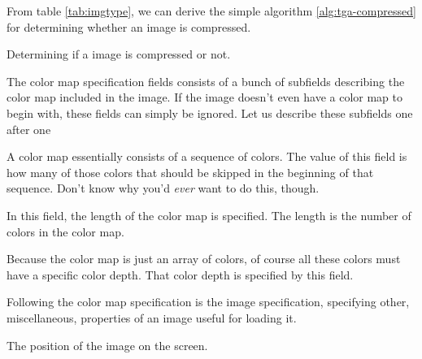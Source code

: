 \begin{refsection}
  From table \ref{tab:imgtype}, we can derive the simple algorithm
  \ref{alg:tga-compressed} for determining whether an image is
  compressed.

  \begin{algorithm}[H]
    \caption{Determining if a \tga image is compressed or not.}
    \label{alg:tga-compressed}
    \begin{algorithmic}[1]
    \end{algorithmic}
  \end{algorithm}


  The color map specification fields consists of a bunch of subfields
  describing the color map included in the image. If the image
  doesn't even have a color map to begin with, these fields can simply
  be ignored. Let us describe these subfields one after one


  A color map essentially consists of a sequence of colors. The value
  of this field is how many of those colors that should be skipped in
  the beginning of that sequence. Don't know why you'd \textit{ever}
  want to do this, though.


  In this field, the length of the color map is specified. The
  length is the number of colors in the color map.


  Because the color map is just an array of colors, of course all
  these colors must have a specific color depth. That color depth is
  specified by this field.


  Following the color map specification is the image specification,
  specifying other, miscellaneous, properties of an image useful for
  loading it.



  The position of the image on the screen.



\end{refsection}
